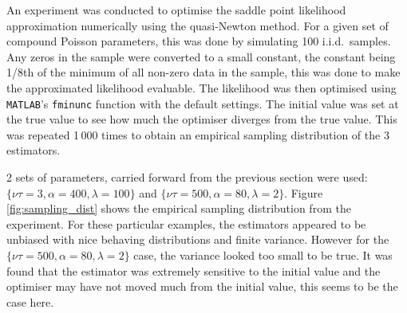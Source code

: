\documentclass[a4paper]{proc}
\begin{document}
An experiment was conducted to optimise the saddle point likelihood approximation numerically using the quasi-Newton method. For a given set of compound Poisson parameters, this was done by simulating 100 i.i.d.~samples. Any zeros in the sample were converted to a small constant, the constant being 1/8th of the minimum of all non-zero data in the sample, this was done to make the approximated likelihood evaluable. The likelihood was then optimised using \texttt{MATLAB}'s \texttt{fminunc} function with the default settings. The initial value was set at the true value to see how much the optimiser diverges from the true value. This was repeated 1\,000 times to obtain an empirical sampling distribution of the 3 estimators.

2 sets of parameters, carried forward from the previous section were used: $\{\nu\tau=3,\alpha=400,\lambda=100\}$ and $\{\nu\tau=500,\alpha=80,\lambda=2\}$. Figure \ref{fig:sampling_dist} shows the empirical sampling distribution from the experiment. For these particular examples, the estimators appeared to be unbiased with nice behaving distributions and finite variance. However for the $\{\nu\tau=500,\alpha=80,\lambda=2\}$ case, the variance looked too small to be true. It was found that the estimator was extremely sensitive to the initial value and the optimiser may have not moved much from the initial value, this seems to be the case here.
\end{document}
